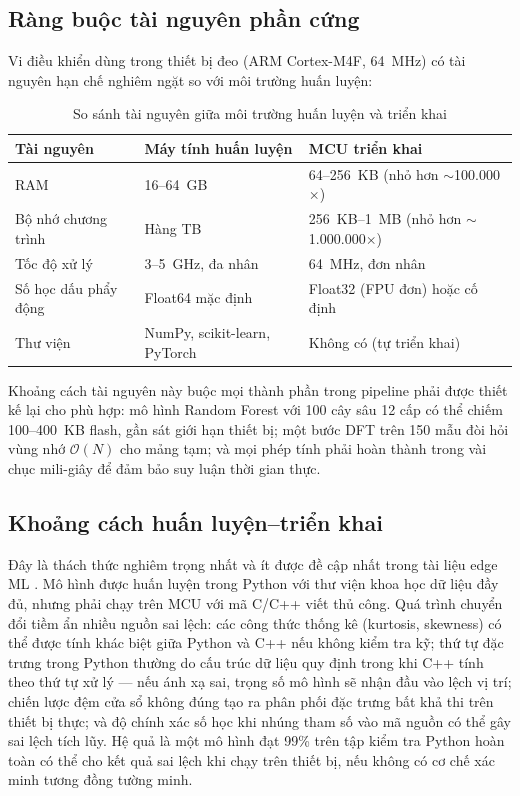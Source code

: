 \subsection{Ràng buộc tài nguyên phần cứng}

Vi điều khiển dùng trong thiết bị đeo (ARM Cortex-M4F, 64~MHz) có tài nguyên hạn chế nghiêm ngặt so với môi trường huấn luyện:

\begin{table}[H]
\centering
\caption{So sánh tài nguyên giữa môi trường huấn luyện và triển khai}
\label{tab:resource_gap}
\small
\begin{tabular}{@{}lll@{}}
\toprule
\textbf{Tài nguyên} & \textbf{Máy tính huấn luyện} & \textbf{MCU triển khai} \\
\midrule
RAM & 16--64~GB & 64--256~KB (nhỏ hơn $\sim$100.000$\times$) \\
Bộ nhớ chương trình & Hàng TB & 256~KB--1~MB (nhỏ hơn $\sim$1.000.000$\times$) \\
Tốc độ xử lý & 3--5~GHz, đa nhân & 64~MHz, đơn nhân \\
Số học dấu phẩy động & Float64 mặc định & Float32 (FPU đơn) hoặc cố định \\
Thư viện & NumPy, scikit-learn, PyTorch & Không có (tự triển khai) \\
\bottomrule
\end{tabular}
\end{table}

Khoảng cách tài nguyên này buộc mọi thành phần trong pipeline phải được thiết kế lại cho phù hợp: mô hình Random Forest với 100 cây sâu 12 cấp có thể chiếm 100--400~KB flash, gần sát giới hạn thiết bị; một bước DFT trên 150 mẫu đòi hỏi vùng nhớ $\mathcal{O}(N)$ cho mảng tạm; và mọi phép tính phải hoàn thành trong vài chục mili-giây để đảm bảo suy luận thời gian thực.

\subsection{Khoảng cách huấn luyện--triển khai}

Đây là thách thức nghiêm trọng nhất và ít được đề cập nhất trong tài liệu edge ML \cite{paleyes2022challenges, sculley2015hidden}. Mô hình được huấn luyện trong Python với thư viện khoa học dữ liệu đầy đủ, nhưng phải chạy trên MCU với mã C/C++ viết thủ công. Quá trình chuyển đổi tiềm ẩn nhiều nguồn sai lệch: các công thức thống kê (kurtosis, skewness) có thể được tính khác biệt giữa Python và C++ nếu không kiểm tra kỹ; thứ tự đặc trưng trong Python thường do cấu trúc dữ liệu quy định trong khi C++ tính theo thứ tự xử lý --- nếu ánh xạ sai, trọng số mô hình sẽ nhận đầu vào lệch vị trí; chiến lược đệm cửa sổ không đúng tạo ra phân phối đặc trưng bất khả thi trên thiết bị thực; và độ chính xác số học khi nhúng tham số vào mã nguồn có thể gây sai lệch tích lũy. Hệ quả là một mô hình đạt 99\% trên tập kiểm tra Python hoàn toàn có thể cho kết quả sai lệch khi chạy trên thiết bị, nếu không có cơ chế xác minh tương đồng tường minh.

